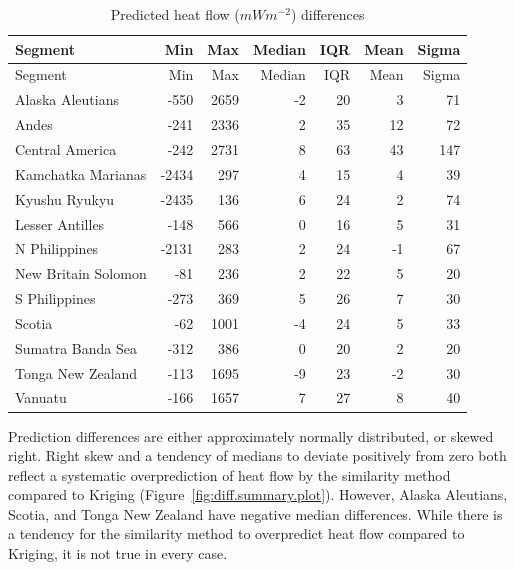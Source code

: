 \documentclass[draft,linenumbers]{agujournal2018}
\begin{document}
\hypertarget{tbl:diff.summary.table}{}
\begin{longtable}[]{@{}lrrrrrr@{}}
\caption{\label{tbl:diff.summary.table}Predicted heat flow
(\(mWm^{-2}\)) differences}\tabularnewline
\toprule
Segment & Min & Max & Median & IQR & Mean & Sigma \\
\midrule
\endfirsthead
\toprule
Segment & Min & Max & Median & IQR & Mean & Sigma \\
\midrule
\endhead
Alaska Aleutians & -550 & 2659 & -2 & 20 & 3 & 71 \\
Andes & -241 & 2336 & 2 & 35 & 12 & 72 \\
Central America & -242 & 2731 & 8 & 63 & 43 & 147 \\
Kamchatka Marianas & -2434 & 297 & 4 & 15 & 4 & 39 \\
Kyushu Ryukyu & -2435 & 136 & 6 & 24 & 2 & 74 \\
Lesser Antilles & -148 & 566 & 0 & 16 & 5 & 31 \\
N Philippines & -2131 & 283 & 2 & 24 & -1 & 67 \\
New Britain Solomon & -81 & 236 & 2 & 22 & 5 & 20 \\
S Philippines & -273 & 369 & 5 & 26 & 7 & 30 \\
Scotia & -62 & 1001 & -4 & 24 & 5 & 33 \\
Sumatra Banda Sea & -312 & 386 & 0 & 20 & 2 & 20 \\
Tonga New Zealand & -113 & 1695 & -9 & 23 & -2 & 30 \\
Vanuatu & -166 & 1657 & 7 & 27 & 8 & 40 \\
\bottomrule
\end{longtable}

Prediction differences are either approximately normally distributed, or
skewed right. Right skew and a tendency of medians to deviate positively
from zero both reflect a systematic overprediction of heat flow by the
similarity method compared to Kriging
(Figure~\ref{fig:diff.summary.plot}). However, Alaska Aleutians, Scotia,
and Tonga New Zealand have negative median differences. While there is a
tendency for the similarity method to overpredict heat flow compared to
Kriging, it is not true in every case.
\end{document}
